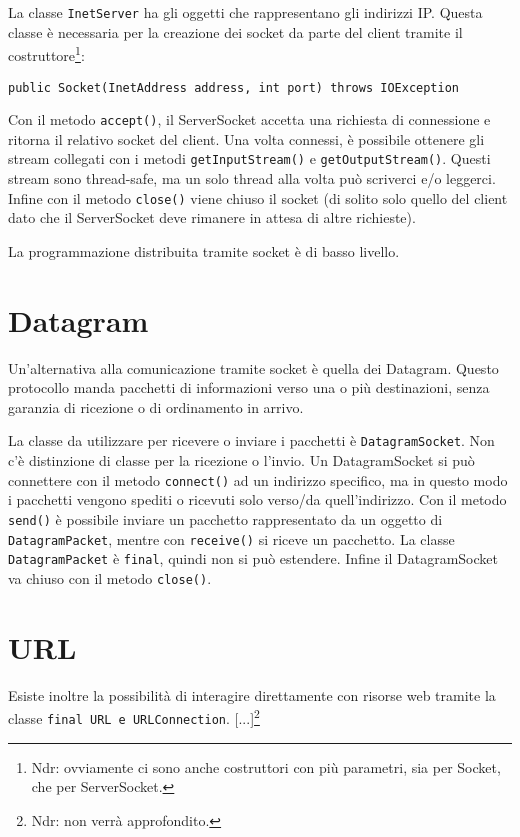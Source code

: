 La classe \texttt{InetServer} ha gli oggetti che rappresentano gli indirizzi IP. Questa classe è necessaria per la creazione dei socket da parte del client tramite il costruttore\footnote{Ndr: ovviamente ci sono anche costruttori con più parametri, sia per Socket, che per ServerSocket.}:
\begin{lstlisting}
public Socket(InetAddress address, int port) throws IOException
\end{lstlisting}
Con il metodo \texttt{accept()}, il ServerSocket accetta una richiesta di connessione e ritorna il relativo socket del client. Una volta connessi, è possibile ottenere gli stream collegati con i metodi \texttt{getInputStream()} e \texttt{getOutputStream()}. Questi stream sono thread-safe, ma un solo thread alla volta può scriverci e/o leggerci. Infine con il metodo \texttt{close()} viene chiuso il socket (di solito solo quello del client dato che il ServerSocket deve rimanere in attesa di altre richieste). 

La programmazione distribuita tramite socket è di basso livello.

\section{Datagram}
Un'alternativa alla comunicazione tramite socket è quella dei Datagram. Questo protocollo manda pacchetti di informazioni verso una o più destinazioni, senza garanzia di ricezione o di ordinamento in arrivo. 

La classe da utilizzare per ricevere o inviare i pacchetti è \texttt{DatagramSocket}. Non c'è distinzione di classe per la ricezione o l'invio. Un DatagramSocket si può connettere con il metodo \texttt{connect()} ad un indirizzo specifico, ma in questo modo i pacchetti vengono spediti o ricevuti solo verso/da quell'indirizzo. Con il metodo \texttt{send()} è possibile inviare un pacchetto rappresentato da un oggetto di \texttt{DatagramPacket}, mentre con \texttt{receive()} si riceve un pacchetto. La classe \texttt{DatagramPacket} è \texttt{final}, quindi non si può estendere. Infine il DatagramSocket va chiuso con il metodo \texttt{close()}.

\section{URL}
Esiste inoltre la possibilità di interagire direttamente con risorse web tramite la classe \texttt{final URL e URLConnection}. [...]\footnote{Ndr: non verrà approfondito.}

